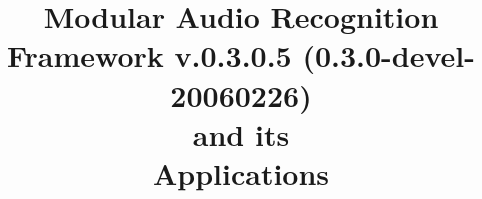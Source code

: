 \documentclass[letterpaper,11pt]{report}
\title{Modular Audio Recognition Framework v.0.3.0.5 (0.3.0-devel-20060226)\\and its\\Applications}
\date{}
\begin{document}
	\begin{titlepage}
		\maketitle
	\end{titlepage}

	
	
	
	
	
	
	
	
	
	
	
	
	
	
	

	\printindex
\end{document}
